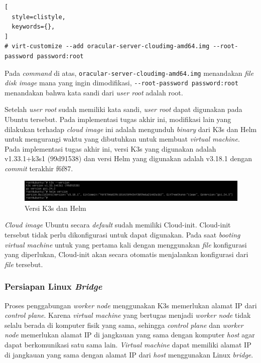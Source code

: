 \begin{lstlisting}[
  style=clistyle,
  keywords={},
]
# virt-customize --add oracular-server-cloudimg-amd64.img --root-password password:root
\end{lstlisting}

Pada \emph{command} di atas, \lstinline{oracular-server-cloudimg-amd64.img} menandakan \emph{file disk image}
mana yang ingin dimodifikasi, \lstinline{--root-password password:root} menandakan bahwa kata sandi
dari \emph{user root} adalah root.

Setelah \emph{user root} sudah memiliki kata sandi, \emph{user root} dapat digunakan
pada Ubuntu tersebut. Pada implementasi tugas akhir ini, modifikasi lain yang dilakukan
terhadap \emph{cloud image} ini adalah mengunduh \emph{binary} dari K3s dan Helm untuk mengurangi
waktu yang dibutuhkan untuk membuat \emph{virtual machine}. Pada implementasi tugas akhir ini,
versi K3s yang digunakan adalah v1.33.1+k3s1 (99d91538) dan versi Helm yang digunakan adalah
v3.18.1 dengan \emph{commit} terakhir f6f87.

\begin{figure}[H]
  \centering
  \includegraphics[scale=0.4]{gambar/k3s-helm-version.png}
  \caption{Versi K3s dan Helm}
  \label{fig:k3s-helm-version}
\end{figure}

\emph{Cloud image} Ubuntu secara \emph{default} sudah memiliki Cloud-init. Cloud-init tersebut
tidak perlu dikonfigurasi untuk dapat digunakan. Pada saat \emph{booting virtual machine} untuk yang
pertama kali dengan menggunakan \emph{file} konfigurasi yang diperlukan, Cloud-init akan secara otomatis
menjalankan konfigurasi dari \emph{file} tersebut.

\subsubsection{Persiapan Linux \emph{Bridge}}
\label{sec:persiapan-linux-bridge}

Proses penggabungan \emph{worker node} menggunakan K3s memerlukan alamat IP
dari \emph{control plane}. Karena \emph{virtual machine} yang bertugas menjadi
\emph{worker node} tidak selalu berada di komputer fisik yang sama, sehingga
\emph{control plane} dan \emph{worker node} memerlukan alamat IP di jangkauan
yang sama dengan komputer \emph{host} agar dapat berkomunikasi satu sama lain.
\emph{Virtual machine} dapat memiliki alamat IP di jangkauan yang sama dengan
alamat IP dari \emph{host} menggunakan Linux \emph{bridge}.

